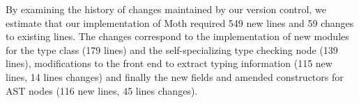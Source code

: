 By examining the history of changes maintained by our version control,
we estimate that our implementation of Moth required
549 new lines and 59 changes to existing lines.
The changes correspond to the implementation of
new modules for the type class (179 lines) and
the self-specializing type checking node (139 lines),
modifications to the front end to extract typing information
(115 new lines, 14 lines changes)
and finally the new fields and amended constructors for AST nodes
(116 new lines, 45 lines changes).




